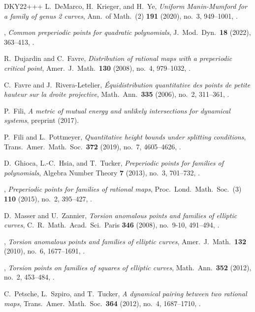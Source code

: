 \documentclass[11pt]{amsart}
\numberwithin{equation}{section}
\theoremstyle{plain}
\theoremstyle{definition}
\theoremstyle{remark}
\begin{document}
\begin{thebibliography}{DKY22+++}
L.~DeMarco, H.~Krieger, and H.~Ye,
\emph{Uniform Manin-Mumford for a family of genus 2 curves},
Ann.\ of Math.~(2) \textbf{191} (2020), no.~3, 949--1001,
. 

\bysame, 
\emph{Common preperiodic points for quadratic polynomials},
J.~Mod.\ Dyn.\ \textbf{18} (2022), 363--413,
.

R.~Dujardin and C.~Favre,
\emph{Distribution of rational maps with a preperiodic critical point},
Amer.~J.\ Math.\ \textbf{130} (2008), no.~4, 979--1032,
.

C.~Favre and J.~Rivera-Letelier,
\emph{\'Equidistribution quantitative des points de petite hauteur sur la droite projective}, 
Math.\ Ann.\ \textbf{335} (2006), no.~2, 311--361,
.

P.~Fili,
\emph{A metric of mutual energy and unlikely intersections for dynamical systems}, preprint  (2017). 

P.~Fili and L.~Pottmeyer,
\emph{Quantitative height bounds under splitting conditions},
Trans.\ Amer.\ Math.\ Soc.\ \textbf{372} (2019), no.~7, 4605--4626,
.

D.~Ghioca, L.-C.~Hsia, and T.~Tucker,
\emph{Preperiodic points for families of polynomials},
Algebra Number Theory \textbf{7} (2013), no.~3, 701--732,
.

\bysame, 
\emph{Preperiodic points for families of rational maps},
Proc.\ Lond.\ Math.\ Soc.~(3) \textbf{110} (2015), no.~2, 395--427,
.

D.~Masser and U.~Zannier,
\emph{Torsion anomalous points and families of elliptic curves},
C.\ R.\ Math.\ Acad.\ Sci.\ Paris \textbf{346} (2008), no.~9-10, 491--494,
.

\bysame, 
\emph{Torsion anomalous points and families of elliptic curves},
Amer.~J.\ Math.\ \textbf{132} (2010), no.~6, 1677--1691,
.

\bysame,
\emph{Torsion points on families of squares of elliptic curves},
Math.\ Ann.\ \textbf{352} (2012), no.~2, 453--484,
.

C.~Petsche, L.~Szpiro, and T.~Tucker,
\emph{A dynamical pairing between two rational maps},
Trans.\ Amer.\ Math.\ Soc.\ \textbf{364} (2012), no.~4, 1687--1710,
.


\end{thebibliography}
\end{document}
